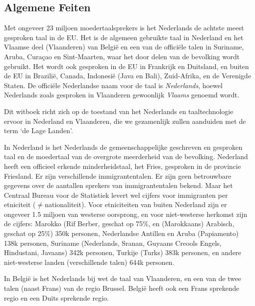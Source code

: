 \documentclass[]{../../metanetpaper}
\begin{document}
\begin{multicols}{2}

\subsection{Algemene Feiten}

Met ongeveer 23 miljoen moedertaalsprekers is het Nederlands de achtste meest gesproken taal in de EU. Het is de algemeen gebruikte taal in Nederland en het Vlaamse deel (Vlaanderen) van Belgi{\"e} en een van de offici{\"e}le talen in Suriname, Aruba, Cura{\c{c}}ao en Sint-Maarten, waar het door delen van de bevolking wordt gebruikt. Het wordt ook gesproken in de EU in Frankrijk en Duitsland, en buiten de EU in Brazili{\"e}, Canada, Indonesi{\"e} (Java en Bali), Zuid-Afrika, en de Verenigde Staten. De offici{\"e}le Nederlandse naam voor de taal is \emph{Nederlands}, hoewel Nederlands zoals gesproken in Vlaanderen gewoonlijk \emph{Vlaams} genoemd wordt.

    Dit witboek richt zich op de toestand van het Nederlands en taaltechnologie ervoor in Nederland en Vlaanderen, die we gezamenlijk zullen aanduiden met de term `de Lage Landen'.

    In Nederland is het Nederlands de gemeenschappelijke geschreven en gesproken taal en de moedertaal van de overgrote meerderheid van de bevolking. Nederland heeft een officieel erkende minderheidstaal, het Fries, gesproken in de provincie Friesland. Er zijn verschillende immigrantentalen. Er zijn geen betrouwbare gegevens over de aantallen sprekers van immigrantentalen bekend. Maar het Centraal Bureau voor de Statistiek \cite{CBS} levert wel cijfers voor immigranten per etniciteit ($\neq$nationaliteit). Voor etniciteiten van buiten Nederland zijn er ongeveer 1.5 miljoen van westerse oorsprong, en voor niet-westerse herkomst zijn de cijfers: Marokko (Rif Berber, geschat op 75\%, en (Marokkaans) Arabisch, geschat op 25\%) 350k personen, Nederlandse Antillen en Aruba (Papiamento) 138k personen, Suriname (Nederlands, Sranan, Guyaans Creools Engels, Hindustani, Javaans) 342k personen, Turkije (Turks) 383k personen, en andere niet-westerse landen (verschillende talen) 644k personen.


    In Belgi{\"e} is het Nederlands bij wet de taal van Vlaanderen, en een van de twee talen (naast Frans) van de regio Brussel. Belgi{\"e} heeft ook een Frans sprekende regio en een Duits sprekende regio.


\end{multicols}
\end{document}
